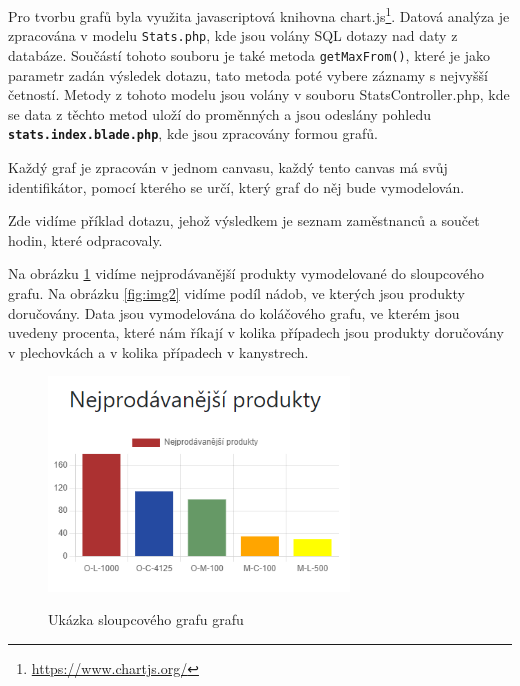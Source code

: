 Pro tvorbu grafů byla využita javascriptová knihovna chart.js\footnote{\url{https://www.chartjs.org/}}. Datová analýza je zpracována v modelu \texttt{Stats.php}, kde jsou volány SQL dotazy nad daty z databáze. Součástí tohoto souboru je také metoda \texttt{getMaxFrom()}, které je jako parametr zadán výsledek dotazu, tato metoda poté vybere záznamy s nejvyšší četností. Metody z tohoto modelu jsou volány v souboru StatsController.php, kde se data z těchto metod uloží do proměnných a jsou odeslány pohledu \texttt{\textbf{stats.\/index.blade.php}}, kde jsou zpracovány formou grafů.

Každý graf je zpracován v jednom canvasu, každý tento canvas má svůj identifikátor, pomocí kterého se určí, který graf do něj bude vymodelován.

Zde vidíme příklad dotazu, jehož výsledkem je seznam zaměstnanců a součet hodin, které odpracovaly.


Na obrázku \ref{fíg:img1} vidíme nejprodávanější produkty vymodelované do sloupcového grafu. Na  obrázku \ref{fig:img2} vidíme podíl nádob, ve kterých jsou produkty doručovány.  Data jsou vymodelována do koláčového grafu, ve kterém jsou uvedeny procenta, které nám říkají v kolika případech jsou produkty doručovány v plechovkách a v kolika případech v kanystrech.

\begin{figure}[H]
\begin{center}
    \includegraphics[width=80mm]{obrazky-figures/stat.png}
    
    \label{fíg:img1}
    \caption{Ukázka sloupcového grafu grafu}
\end{center}
\end{figure}



